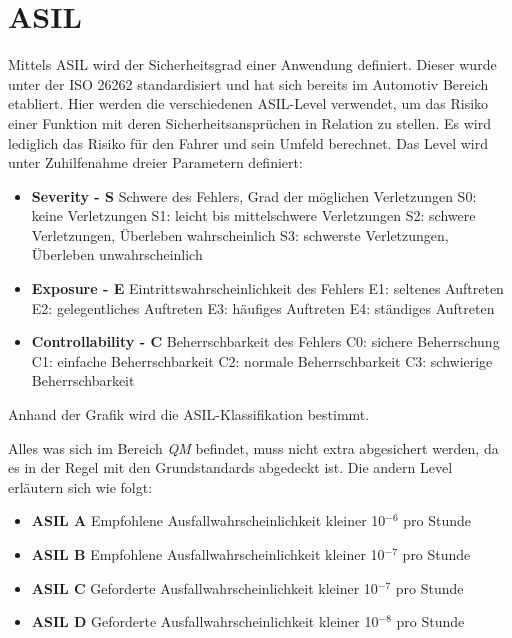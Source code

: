 \section{\acl{ASIL}}\label{sec:GrundlagenASIL}

Mittels \acf{ASIL} wird der Sicherheitsgrad einer Anwendung definiert. Dieser wurde unter der ISO 26262 standardisiert und hat sich bereits im Automotiv Bereich etabliert. Hier werden die verschiedenen \acs{ASIL}-Level verwendet, um das Risiko einer Funktion mit deren Sicherheitsansprüchen in Relation zu stellen. Es wird lediglich das Risiko für den Fahrer und sein Umfeld berechnet. 
Das Level wird unter Zuhilfenahme dreier Parametern definiert:
\begin{itemize}
	\item \textbf{Severity - S} 
	\newline Schwere des Fehlers, Grad der möglichen Verletzungen
	\subitem S0: keine Verletzungen
	\subitem S1: leicht bis mittelschwere Verletzungen
	\subitem S2: schwere Verletzungen, Überleben wahrscheinlich
	\subitem S3: schwerste Verletzungen, Überleben unwahrscheinlich
	\item \textbf{Exposure - E}
	\newline Eintrittswahrscheinlichkeit des Fehlers
	\subitem E1: seltenes Auftreten
	\subitem E2: gelegentliches Auftreten
	\subitem E3: häufiges Auftreten
	\subitem E4: ständiges Auftreten
	
	\newpage	
	\item \textbf{Controllability - C}
	\newline Beherrschbarkeit des Fehlers
	\subitem C0: sichere Beherrschung
	\subitem C1: einfache Beherrschbarkeit
	\subitem C2: normale Beherrschbarkeit
	\subitem C3: schwierige Beherrschbarkeit
\end{itemize}
Anhand der Grafik wird die ASIL-Klassifikation bestimmt.

Alles was sich im Bereich \emph{QM} befindet, muss nicht extra abgesichert werden, da es in der Regel mit den Grundstandards abgedeckt ist. Die andern Level erläutern sich wie folgt:
\begin{itemize}
	\item \textbf{ASIL A}
	\newline Empfohlene Ausfallwahrscheinlichkeit kleiner 10$^{-6}$ pro Stunde
	\item \textbf{ASIL B}
	\newline Empfohlene Ausfallwahrscheinlichkeit kleiner 10$^{-7}$ pro Stunde
	\item \textbf{ASIL C}
	\newline Geforderte Ausfallwahrscheinlichkeit kleiner 10$^{-7}$ pro Stunde
	\item \textbf{ASIL D}
	\newline Geforderte Ausfallwahrscheinlichkeit kleiner 10$^{-8}$ pro Stunde 
\end{itemize}
